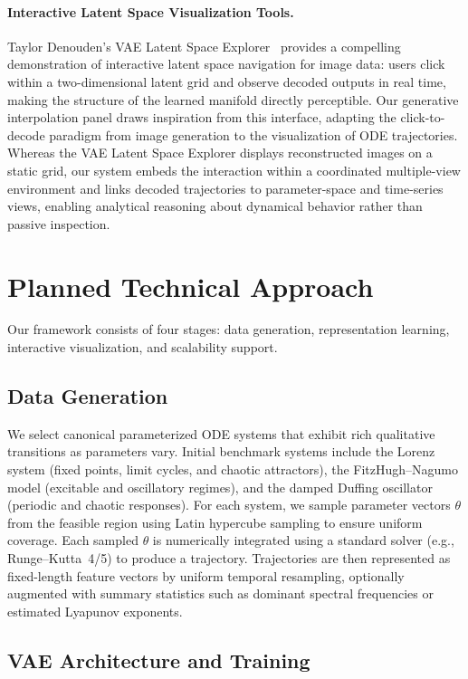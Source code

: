\documentclass{article}
\begin{document}
\paragraph{Interactive Latent Space Visualization Tools.}
Taylor Denouden's VAE Latent Space
Explorer~\cite{denouden2017vaexplorer} provides a compelling demonstration of
interactive latent space navigation for image data: users click within a
two-dimensional latent grid and observe decoded outputs in real time, making
the structure of the learned manifold directly perceptible. Our generative
interpolation panel draws inspiration from this interface, adapting the
click-to-decode paradigm from image generation to the visualization of ODE
trajectories. Whereas the VAE Latent Space Explorer displays reconstructed
images on a static grid, our system embeds the interaction within a
coordinated multiple-view environment and links decoded trajectories to
parameter-space and time-series views, enabling analytical reasoning about
dynamical behavior rather than passive inspection.
    

\section{Planned Technical Approach}

Our framework consists of four stages: data generation, representation
learning, interactive visualization, and scalability support.

\subsection{Data Generation}

We select canonical parameterized ODE systems that exhibit rich qualitative
transitions as parameters vary. Initial benchmark systems include the Lorenz
system (fixed points, limit cycles, and chaotic attractors), the
FitzHugh--Nagumo model (excitable and oscillatory regimes), and the damped
Duffing oscillator (periodic and chaotic responses). For each system, we sample
parameter vectors $\theta$ from the feasible region using Latin hypercube
sampling to ensure uniform coverage. Each sampled $\theta$ is numerically
integrated using a standard solver (e.g., Runge--Kutta~4/5) to produce a
trajectory. Trajectories are then represented as fixed-length feature vectors
by uniform temporal resampling, optionally augmented with summary statistics
such as dominant spectral frequencies or estimated Lyapunov exponents.

\subsection{VAE Architecture and Training}
\end{document}
